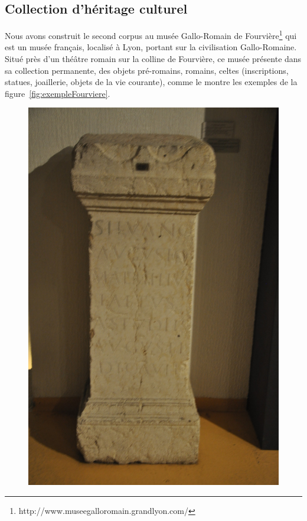 \subsection{Collection d'héritage culturel}
\label{subsec:corpus_heritage}

Nous avons construit le second corpus au musée Gallo-Romain de Fourvière\footnote{http://www.museegalloromain.grandlyon.com/} qui est un musée français, localisé à Lyon, portant sur la civilisation Gallo-Romaine. Situé près d'un théâtre romain sur la colline de Fourvière, ce musée présente dans sa collection permanente, des objets pré-romains, romains, celtes (inscriptions, statues, joaillerie, objets de la vie courante), comme le montre les exemples de la figure~\ref{fig:exempleFourviere}.

\begin{figure}[htb]
\centering
    \begin{minipage}[c]{.2\linewidth}
      \includegraphics[width=\linewidth]{figures/B-016-01.jpg}

\end{minipage}
\end{figure}
